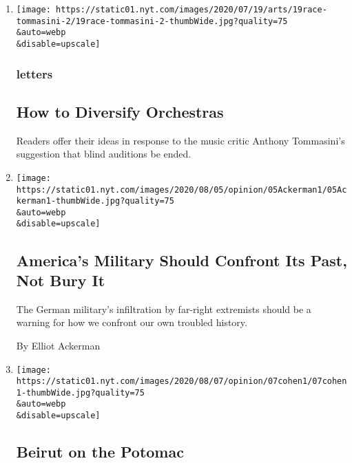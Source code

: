 \begin{enumerate}
\def\labelenumi{\arabic{enumi}.}
\item
  \href{/2020/08/08/opinion/letters/orchestras-race-diversity.html}{}

  \texttt{[image: https://static01.nyt.com/images/2020/07/19/arts/19race-tommasini-2/19race-tommasini-2-thumbWide.jpg?quality=75\\\&auto=webp\\\&disable=upscale]}

  \hypertarget{letters}{%
  \subsubsection{letters}\label{letters}}

  \hypertarget{how-to-diversify-orchestras}{%
  \subsection{How to Diversify
  Orchestras}\label{how-to-diversify-orchestras}}

  Readers offer their ideas in response to the music critic Anthony
  Tommasini's suggestion that blind auditions be ended.
\item
  \href{/2020/08/08/opinion/nazi-confederate-military-history-ksk.html}{}

  \texttt{[image: https://static01.nyt.com/images/2020/08/05/opinion/05Ackerman1/05Ackerman1-thumbWide.jpg?quality=75\\\&auto=webp\\\&disable=upscale]}

  \hypertarget{americas-military-should-confront-its-past-not-bury-it}{%
  \subsection{America's Military Should Confront Its Past, Not Bury
  It}\label{americas-military-should-confront-its-past-not-bury-it}}

  The German military's infiltration by far-right extremists should be a
  warning for how we confront our own troubled history.

  By Elliot Ackerman
\item
  \href{/2020/08/07/opinion/beirut-explosion.html}{}

  \texttt{[image: https://static01.nyt.com/images/2020/08/07/opinion/07cohen1/07cohen1-thumbWide.jpg?quality=75\\\&auto=webp\\\&disable=upscale]}

  \hypertarget{beirut-on-the-potomac}{%
  \subsection{Beirut on the Potomac}\label{beirut-on-the-potomac}}


\end{enumerate}
